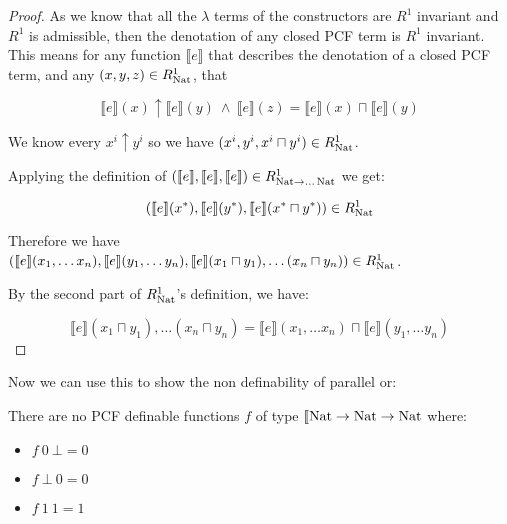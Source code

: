 \begin{proof}
As we know that all the  $\lambda$ terms of the constructors are $R^1$ invariant and $R^1$ is admissible, then the denotation of any closed PCF term is $R^1$ invariant. This means for any function $\llbracket e \rrbracket$ that describes the denotation of a closed PCF term, and any $(x,y,z) \in R_{\operatorname{Nat}}^1$, that

\[ \llbracket e \rrbracket (x) \uparrow \llbracket e \rrbracket(y) \ \wedge \ \llbracket e \rrbracket(z) = \llbracket e \rrbracket(x) \sqcap \llbracket e \rrbracket(y) \]

We know every $x^i \uparrow y^i$ so we have $(x^i, y^i, x^i \sqcap y^i) \in R_{\operatorname{Nat}}^1$.

Applying the definition of $(\llbracket e \rrbracket , \llbracket e \rrbracket, \llbracket e \rrbracket) \in R_{\operatorname{Nat} \to \dots \operatorname{Nat}}^1$ we get:

\[ (\llbracket e \rrbracket(x^*), \llbracket e \rrbracket(y^*), \llbracket e \rrbracket (x^* \sqcap y^*)) \in R_{\operatorname{Nat}}^1 \]

Therefore we have $(\llbracket e \rrbracket(x_1, \dots x_n), \llbracket e \rrbracket(y_1, \dots y_n),\llbracket e \rrbracket(x_1 \sqcap y_1), \dots (x_n \sqcap y_n)) \in R_{\operatorname{Nat}}^1$.


By the second part of $R_{\operatorname{Nat}}^1$'s definition, we have:

\[ \llbracket e \rrbracket(x_1 \sqcap y_1), \dots (x_n \sqcap y_n) = \llbracket e \rrbracket(x_1, \dots x_n) \sqcap \llbracket e \rrbracket(y_1, \dots y_n)\]
\end{proof}

Now we can use this to show the non definability of parallel or:

\vspace{0.5cm}

\begin{cor}{\citep{Streicher06}}
There are no PCF definable functions $f$ of type $\llbracket \operatorname{Nat} \to \operatorname{Nat} \to \operatorname{Nat}$ where:

\begin{itemize}
\item{$f \ 0 \ \bot = 0$}
\item{$f \ \bot \ 0 = 0$}
\item{$f \ 1 \ 1 = 1$}
\end{itemize}
\end{cor}


